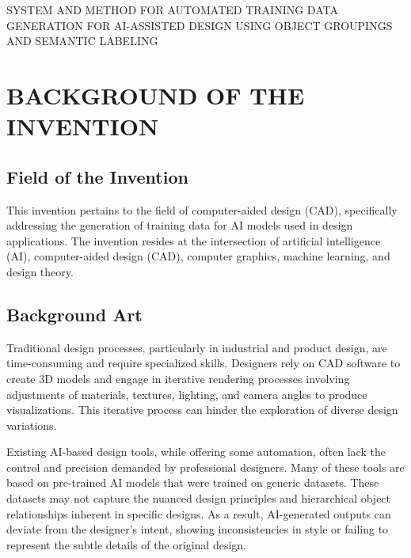 \documentclass[12pt]{report}
\begin{document}
\begin{center}
{\Large SYSTEM AND METHOD FOR AUTOMATED TRAINING DATA GENERATION FOR AI-ASSISTED DESIGN USING OBJECT GROUPINGS AND SEMANTIC LABELING}
\end{center}


\vspace{24pt}


\section{BACKGROUND OF THE INVENTION}

\subsection{Field of the Invention}
This invention pertains to the field of computer-aided design (CAD), specifically addressing the generation of training data for AI models used in design applications. The invention resides at the intersection of artificial intelligence (AI), computer-aided design (CAD), computer graphics, machine learning, and design theory.

\subsection{Background Art}
Traditional design processes, particularly in industrial and product design, are time-consuming and require specialized skills.  Designers rely on CAD software to create 3D models and engage in iterative rendering processes involving adjustments of materials, textures, lighting, and camera angles to produce visualizations. This iterative process can hinder the exploration of diverse design variations.

Existing AI-based design tools, while offering some automation, often lack the control and precision demanded by professional designers. Many of these tools are based on pre-trained AI models that were trained on generic datasets. These datasets may not capture the nuanced design principles and hierarchical object relationships inherent in specific designs. As a result, AI-generated outputs can deviate from the designer's intent, showing inconsistencies in style or failing to represent the subtle details of the original design.
\end{document}
